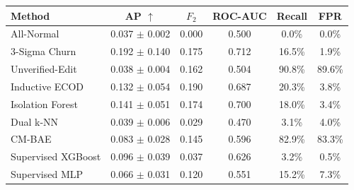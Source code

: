 \begin{center}\small\setlength{\tabcolsep}{5pt}
\begin{tabular}{lccccc}
\toprule
Method & AP $\uparrow$ & $F_2$ & ROC-AUC & Recall & FPR \\
\midrule
All-Normal & 0.037 $\pm$ 0.002 & 0.000 & 0.500 & 0.0\% & 0.0\% \\
3-Sigma Churn & 0.192 $\pm$ 0.140 & 0.175 & 0.712 & 16.5\% & 1.9\% \\
Unverified-Edit & 0.038 $\pm$ 0.004 & 0.162 & 0.504 & 90.8\% & 89.6\% \\
Inductive ECOD & 0.132 $\pm$ 0.054 & 0.190 & 0.687 & 20.3\% & 3.8\% \\
Isolation Forest & 0.141 $\pm$ 0.051 & 0.174 & 0.700 & 18.0\% & 3.4\% \\
Dual k-NN & 0.039 $\pm$ 0.006 & 0.029 & 0.470 & 3.1\% & 4.0\% \\
CM-BAE & 0.083 $\pm$ 0.028 & 0.145 & 0.596 & 82.9\% & 83.3\% \\
Supervised XGBoost & 0.096 $\pm$ 0.039 & 0.037 & 0.626 & 3.2\% & 0.5\% \\
Supervised MLP & 0.066 $\pm$ 0.031 & 0.120 & 0.551 & 15.2\% & 7.3\% \\
\bottomrule\end{tabular}
\end{center}
